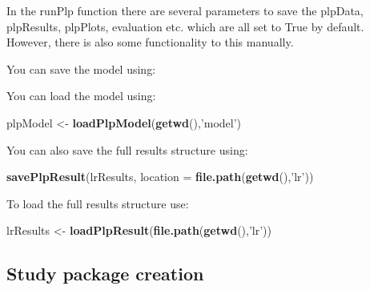 \documentclass[]{book}
\newenvironment{Shaded}{\begin{snugshade}}{\end{snugshade}}
\newcommand{\KeywordTok}[1]{\textcolor[rgb]{0.13,0.29,0.53}{\textbf{#1}}}
\newcommand{\DataTypeTok}[1]{\textcolor[rgb]{0.13,0.29,0.53}{#1}}
\newcommand{\StringTok}[1]{\textcolor[rgb]{0.31,0.60,0.02}{#1}}
\newcommand{\OperatorTok}[1]{\textcolor[rgb]{0.81,0.36,0.00}{\textbf{#1}}}
\newcommand{\NormalTok}[1]{#1}
\begin{document}
In the runPlp function there are several parameters to save the plpData,
plpResults, plpPlots, evaluation etc. which are all set to True by
default. However, there is also some functionality to this manually.

You can save the model using:

\begin{Shaded}
\end{Shaded}

You can load the model using:

\begin{Shaded}
\begin{Highlighting}[]
\NormalTok{plpModel <-}\StringTok{ }\KeywordTok{loadPlpModel}\NormalTok{(}\KeywordTok{getwd}\NormalTok{(),}\StringTok{'model'}\NormalTok{)}
\end{Highlighting}
\end{Shaded}

You can also save the full results structure using:

\begin{Shaded}
\begin{Highlighting}[]
\KeywordTok{savePlpResult}\NormalTok{(lrResults, }\DataTypeTok{location =} \KeywordTok{file.path}\NormalTok{(}\KeywordTok{getwd}\NormalTok{(),}\StringTok{'lr'}\NormalTok{))}
\end{Highlighting}
\end{Shaded}

To load the full results structure use:

\begin{Shaded}
\begin{Highlighting}[]
\NormalTok{lrResults <-}\StringTok{ }\KeywordTok{loadPlpResult}\NormalTok{(}\KeywordTok{file.path}\NormalTok{(}\KeywordTok{getwd}\NormalTok{(),}\StringTok{'lr'}\NormalTok{))}
\end{Highlighting}
\end{Shaded}

\newpage

\subsection{Study package creation}\label{study-package-creation}
\end{document}
